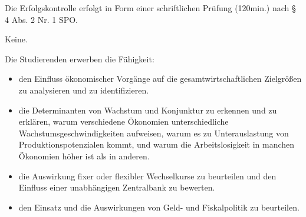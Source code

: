 \begin{course}

\setdoclanguagegerman
{}



\coursehead


\label{cour_6845.dp_997}


\begin{styleenv}
\begin{assessment}
Die Erfolgskontrolle erfolgt in Form einer schriftlichen Prüfung (120min.) nach § 4 Abs. 2 Nr. 1 SPO.


\end{assessment}

\begin{conditions}Keine.\end{conditions}


\end{styleenv}

\begin{learningoutcomes}
Die Studierenden erwerben die Fähigkeit:

 \begin{itemize}\item den Einfluss ökonomischer Vorgänge auf die gesamtwirtschaftlichen Zielgrößen zu analysieren und zu identifizieren.  \end{itemize}\begin{itemize}\item die Determinanten von Wachstum und Konjunktur zu erkennen und zu erklären, warum verschiedene Ökonomien unterschiedliche Wachstumsgeschwindigkeiten aufweisen, warum es zu Unterauslastung von Produktionspotenzialen kommt, und warum die Arbeitslosigkeit in manchen Ökonomien höher ist als in anderen.  \end{itemize}\begin{itemize}\item die Auswirkung fixer oder flexibler Wechselkurse zu beurteilen und den Einfluss einer unabhängigen Zentralbank zu bewerten.  \end{itemize}\begin{itemize}\item den Einsatz und die Auswirkungen von Geld- und Fiskalpolitik zu beurteilen.  \end{itemize}
\end{learningoutcomes}


\end{course}
